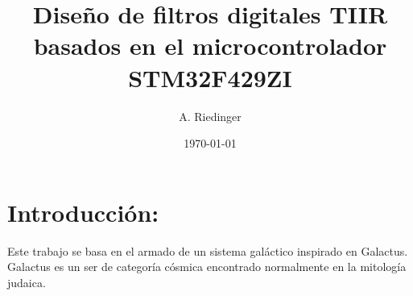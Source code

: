 \documentclass{IEEEtran}
\author{A. Riedinger}
\date{\today}
\title{Diseño de filtros digitales TIIR basados en el microcontrolador STM32F429ZI}
\begin{document}
\maketitle
\tableofcontents


\section{Introducción:}
\label{sec:org8bf2e3b}

Este trabajo se basa en el armado de un sistema galáctico inspirado en Galactus. Galactus es un ser de categoría cósmica encontrado normalmente en la mitología judaica.
\end{document}
